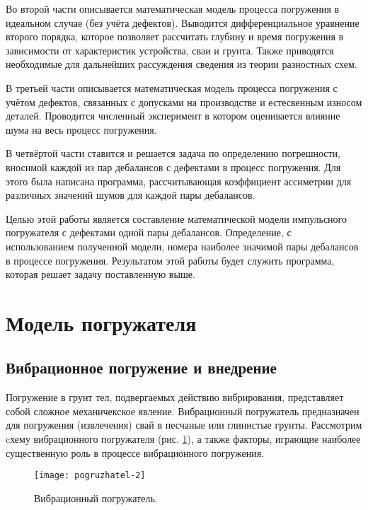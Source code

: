 Во второй части описывается математическая модель процесса погружения в идеальном случае (без учёта дефектов).
Выводится дифференциальное уравнение второго порядка, которое позволяет рассчитать глубину и время
погружения в зависимости от характеристик устройства, сваи и грунта.
Также приводятся необходимые для дальнейших рассуждения сведения из теории разностных схем.

В третьей части описывается математическая модель процесса погружения с учётом дефектов, связанных с допусками
на производстве и естесвенным износом деталей. Проводится численный эксперимент в котором оценивается влияние
шума на весь процесс погружения.

В четвёртой части ставится и решается задача по определению погрешности, вносимой
каждой из пар дебалансов с дефектами в процесс погружения. Для этого была написана программа,
рассчитывающая коэффициент ассиметрии для различных значений шумов для каждой пары дебалансов.

Целью этой работы является составление математической модели импульсного погружателя с дефектами одной пары дебалансов.
Определение, с использованием полученной модели, номера наиболее значимой пары дебалансов в процессе погружения.
Результатом этой работы будет служить программа, которая решает задачу поставленную выше.

\clearpage

\section{Модель погружателя}

\subsection{Вибрационное погружение и внедрение}

Погружение в грунт тел, подвергаемых действию вибрирования, представляет собой сложное механичекское явление. Вибрационный
погружатель предназначен для погружения (извлечения) свай в песчаные или глинистые грунты. Рассмотрим cхему вибрационного
погружателя (рис. \ref{fig:vp}), а также факторы, играющие наиболее существенную роль в процессе вибрационного погружения.

\begin{figure}[h]
    \centering
    \texttt{[image: pogruzhatel-2]}
    \caption{Вибрационный погружатель.}
    \label{fig:vp}
\end{figure}

